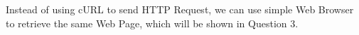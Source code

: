 \documentclass[10pt,a4paper]{article}
\begin{document}

Instead of using cURL to send HTTP Request, we can use simple Web Browser to retrieve the same Web Page, which will be shown in Question 3.
\end{document}
